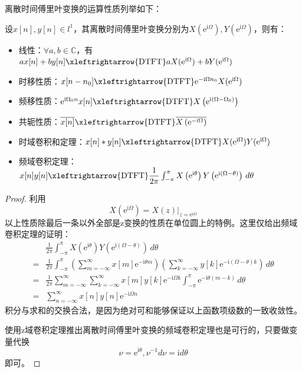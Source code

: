 \documentclass{ctexbook}
\begin{document}
离散时间傅里叶变换的运算性质列举如下：
\begin{proposition}[离散时间傅里叶变换的运算性质]
    设$x[n],y[n]\in l^1$，其离散时间傅里叶变换分别为$X(\mathrm{e}^{\mathrm{i}\Omega}),Y(\mathrm{e}^{\mathrm{i}\Omega})$，则有：\begin{itemize}
        \item  线性：$\forall a,b\in\mathbb{C}$，有$a x[n]+b y[n]\xleftrightarrow{\text{DTFT}} a X(\mathrm{e}^{\mathrm{i}\Omega})+b Y(\mathrm{e}^{\mathrm{i}\Omega})$
        \item 时移性质：$x[n-n_0]\xleftrightarrow{\text{DTFT}}\mathrm{e}^{-\mathrm{i}\Omega n_0}X(\mathrm{e}^{\mathrm{i}\Omega})$
        \item 频移性质：$\mathrm{e}^{\mathrm{i}\Omega_0 n}x[n]\xleftrightarrow{\text{DTFT}}X\left(\mathrm{e}^{\mathrm{i}(\Omega-\Omega_0)}\right)$
        \item 共轭性质：$\overline{x[n]}\xleftrightarrow{\text{DTFT}}\overline{X\left(\mathrm{e}^{-\mathrm{i}\Omega}\right)}$
        \item 时域卷积和定理：$x[n]*y[n]\xleftrightarrow{\text{DTFT}}X(\mathrm{e}^{\mathrm{i}\Omega})Y(\mathrm{e}^{\mathrm{i}\Omega})$
        \item 频域卷积定理：$x[n]y[n]\xleftrightarrow{\text{DTFT}}\dfrac{1}{2\pi}\int_{-\pi}^{\pi}X\left(\mathrm{e}^{\mathrm{i}\theta}\right)Y\left(\mathrm{e}^{\mathrm{i}(\Omega-\theta)}\right)\,d\theta$
    \end{itemize}
\end{proposition}
\begin{proof}
    利用\[X(\mathrm{e}^{\mathrm{i}\Omega})=X(z)|_{z=\mathrm{e}^{\mathrm{i}\Omega}}\]
    以上性质除最后一条以外全部是z变换的性质在单位圆上的特例。这里仅给出频域卷积定理的证明：
    \begin{align*}
        &\frac{1}{2\pi}\int_{-\pi}^{\pi}X\left(\mathrm{e}^{\mathrm{i}\theta}\right)Y\left(\mathrm{e}^{\mathrm{i}(\Omega-\theta)}\right)\,d\theta\\
        =&\frac{1}{2\pi}\int_{-\pi}^{\pi}\left(\sum_{m=-\infty}^{\infty}x[m]\mathrm{e}^{-\mathrm{i}\theta m}\right)\left(\sum_{k=-\infty}^{\infty}y[k]\mathrm{e}^{-\mathrm{i}(\Omega-\theta) k}\right)\,d\theta\\
        =&\frac{1}{2\pi}\sum_{m=-\infty}^{\infty}\sum_{k=-\infty}^{\infty}x[m]y[k]\mathrm{e}^{-\mathrm{i}\Omega k}\int_{-\pi}^{\pi}\mathrm{e}^{-\mathrm{i}\theta (m-k)}\,d\theta\\
        =&\sum_{n=-\infty}^{\infty}x[n]y[n]\mathrm{e}^{-\mathrm{i}\Omega n}
    \end{align*}
    积分与求和的交换合法，是因为绝对可和能够保证以上函数项级数的一致收敛性。

    使用z域卷积定理推出离散时间傅里叶变换的频域卷积定理也是可行的，只要做变量代换
    $$\nu=\mathrm{e}^{\mathrm{i}\theta},\nu^{-1}d\nu=\mathrm{i}d\theta$$
    即可。
\end{proof}
\end{document}
